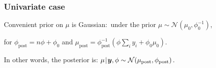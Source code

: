\documentclass[18pt]{beamer}
\newcommand{\defineTightItemizeSpacing}{%
	\setlength{\abovedisplayskip}{.25\baselineskip}%
	\setlength{\belowdisplayskip}{.25\baselineskip}%
}
\newenvironment{tightEquation*}{%
	\defineTightItemizeSpacing%
	\begin{equation*}
}{
	\end{equation*} \ignorespacesafterend
}
\newcommand{\given}{\thinnerspace | \thinnerspace}
\newcommand{\thinnerspace}{\mskip.5\thinmuskip}
\newcommand{\normalDist}{\mathcal{N}}
\newcommand{\density}{\pi}
\newcommand{\likelihood}{L}
\begin{document}
\newcommand{\priorPrec}{\phi_0}
\newcommand{\postPrec}{\phi_{\textrm{post}}}
\begin{frame}
\frametitle{Univariate case}
Convenient prior on $\mu$ is Gaussian:\ under the prior $\mu \sim \normalDist(\mu_0, \priorPrec^{-1})$,%
\begin{tightEquation*}
\end{tightEquation*}
for $\postPrec = n \phi + \priorPrec$ and $\mu_{\textrm{post}} = \postPrec^{-1} \left( \phi {\textstyle \sum_i} y_i + \priorPrec \mu_0 \right)$.

\pause
\vspace*{.3\baselineskip}
In other words, the posterior is:
$
\mu \given \bm{y}, \phi
	\sim \normalDist\!\left( \mu_{\textrm{post}}, \postPrec \right).
$
\end{frame}
\end{document}
